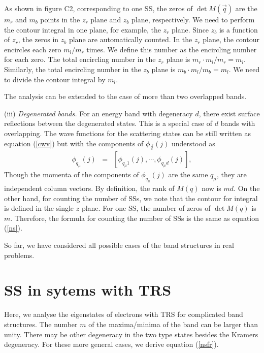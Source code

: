 \documentclass[aps,pra,amsmath,twocolumn,showpacs,bibnotes,10pt]{revtex4-1}
\begin{document}
As shown in figure C2, corresponding to one SS, the zeros of $\det M(\vec q)$ are the $m_r$ and $m_b$ points in the $z_r$ plane and $z_b$ plane, respectively. We need to perform the contour integral in one plane, for example, the $z_r$ plane. Since $z_b$ is a function of $z_r$, the zeros in $z_b$ plane are automatically counted. In the $z_r$ plane, the contour encircles each zero $m_l/m_r$ times. We define this number as the encircling number for each zero. The total encircling number in the $z_r$ plane is $m_r\cdot m_l/m_r = m_l$. Similarly, the total encircling number in the $z_b$ plane is $m_b\cdot m_l/m_b = m_l$. We need to divide the contour integral by $m_l$. 

The analysis can be extended to the case of more than two overlapped bands.  

(iii) {\it Degenerated bands.} For an energy band with degeneracy $d$, there exist surface reflections between the degenerated states. This is a special case of $d$ bands with overlapping. The wave functions for the scattering states can be still written as equation (\ref{cwv}) but with the components of $\phi_{\vec q}(j)$ understood as
\begin{eqnarray}
\phi_{q_{\mu}}(j) &=& [\phi_{q_{\mu}1}(j),\cdots,\phi_{q_{\mu}d}(j)], \nonumber 
\end{eqnarray}
Though the momenta of the components of $\phi_{q_{\mu}}(j)$ are the same $q_{\mu}$, they are independent column vectors. By definition, the rank of $M(q)$ now is $md$. On the other hand, for counting the number of SSs, we note that the contour for integral is defined in the single $z$ plane. For one SS, the number of zeros of $\det M(q)$ is $m$. Therefore, the formula for counting the number of SSs is the same as equation (\ref{ns}). 

So far, we have considered all possible cases of the band structures in real problems.

\section{SS in sytems with TRS}
\renewcommand{\theequation}{D\arabic{equation}}
\setcounter{equation}{0}

Here, we analyse the eigenstates of electrons with TRS for complicated band structures. The number $m$ of the maxima/minima of the band can be larger than unity. There may be other degeneracy in the two type states besides the Kramers degeneracy. For these more general cases, we derive equation (\ref{nsfr}).
\end{document}
